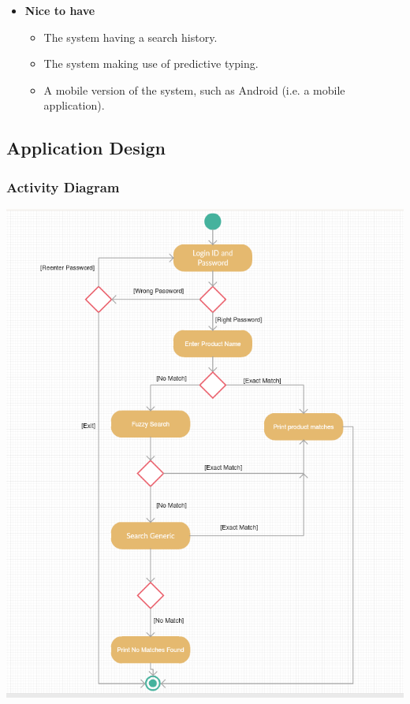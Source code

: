 \documentclass[a4paper,10pt]{article}
\begin{document}
\begin{enumerate}
\begin{itemize}
		\item \textbf{Nice to have}
		\begin{itemize}
		\item The system having a search history. 
		\item The system making use of predictive typing.
		\item A mobile version of the system, such as Android (i.e. a mobile application).
		\end{itemize}
\end{itemize}
		\end{enumerate} 
	
	\subsection{Application Design}
	\subsubsection {Activity Diagram}
		 \includegraphics[scale=0.62]{Diagrams/ActivityDiagram.png}\\
		 
\end{document}
